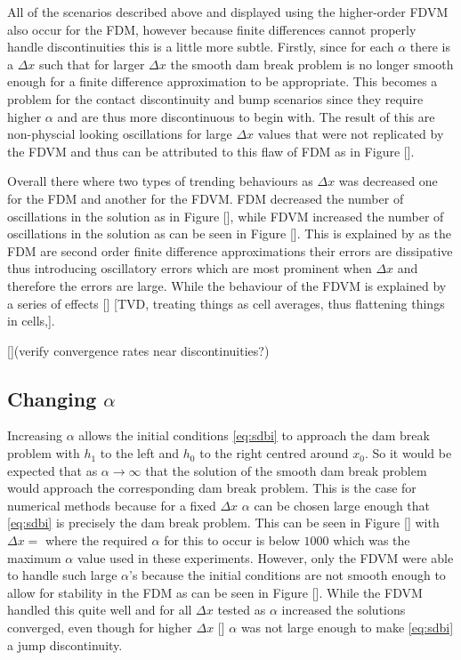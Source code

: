 \documentclass[SingleSpace,12pt,Proceedings]{Serre_ASCE}
\begin{document}
All of the scenarios described above and displayed using the higher-order FDVM also occur for the FDM, however because finite differences cannot properly handle discontinuities this is a little more subtle. Firstly, since for each $\alpha$ there is a $\Delta x$ such that for larger $\Delta x$ the smooth dam break problem is no longer smooth enough for a finite difference approximation to be appropriate. This becomes a problem for the contact discontinuity and bump scenarios since they require higher $\alpha$ and are thus more discontinuous to begin with. The result of this are non-physcial looking oscillations for large $\Delta x$ values that were not replicated by the FDVM and thus can be attributed to this flaw of FDM as in Figure []. 

Overall there where two types of trending behaviours as $\Delta x$ was decreased one for the FDM and another for the FDVM. FDM decreased the number of oscillations in the solution as in Figure [], while FDVM increased the number of oscillations in the solution as can be seen in Figure []. This is explained by  as the FDM are second order finite difference approximations their errors are dissipative thus introducing oscillatory errors which are most prominent when $\Delta x$ and therefore the errors are large. While the behaviour of the FDVM is explained by a series of effects [] [TVD, treating things as cell averages, thus flattening things in cells,]. 

 

[](verify convergence rates near discontinuities?) 

\subsection{Changing $\alpha$}
Increasing $\alpha$ allows the initial conditions \eqref{eq:sdbi} to approach the dam break problem with $h_1$ to the left and $h_0$ to the right centred around $x_0$. So it would be expected that as $\alpha \rightarrow \infty$ that the solution of the smooth dam break problem would approach the corresponding dam break problem. This is the case for numerical methods because for a fixed $\Delta x$ $\alpha$ can be chosen large enough that \eqref{eq:sdbi} is precisely the dam break problem. This can be seen in Figure [] with $\Delta x =$ where the required $\alpha$ for this to occur is below $1000$ which was the maximum $\alpha$ value used in these experiments. However, only the FDVM were able to handle such large $\alpha$'s because the initial conditions are not smooth enough to allow for stability in the FDM as can be seen in Figure []. While the FDVM handled this quite well and for all $\Delta x$ tested as $\alpha$ increased the solutions converged, even though for higher $\Delta x$ [] $\alpha$ was not large enough to make \eqref{eq:sdbi} a jump discontinuity. 
\end{document}
